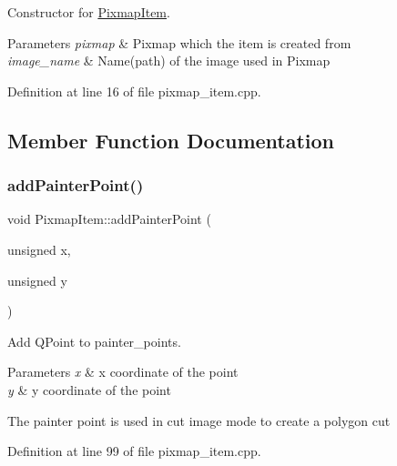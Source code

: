 Constructor for \mbox{\hyperlink{classPixmapItem}{Pixmap\+Item}}. 


\begin{DoxyParams}{Parameters}
{\em pixmap} & Pixmap which the item is created from \\
\hline
{\em image\+\_\+name} & Name(path) of the image used in Pixmap \\
\hline
\end{DoxyParams}


Definition at line 16 of file pixmap\+\_\+item.\+cpp.



\subsection{Member Function Documentation}
\mbox{\label{classPixmapItem_a6e18b1223f61d40dba6e96f4da15ce5c}} 
\subsubsection{\texorpdfstring{add\+Painter\+Point()}{addPainterPoint()}}
{\footnotesize\ttfamily void Pixmap\+Item\+::add\+Painter\+Point (\begin{DoxyParamCaption}\item[{unsigned}]{x,  }\item[{unsigned}]{y }\end{DoxyParamCaption})}



Add Q\+Point to painter\+\_\+points. 


\begin{DoxyParams}{Parameters}
{\em x} & x coordinate of the point \\
\hline
{\em y} & y coordinate of the point\\
\hline
\end{DoxyParams}
The painter point is used in cut image mode to create a polygon cut 

Definition at line 99 of file pixmap\+\_\+item.\+cpp.

\mbox{\label{classPixmapItem_a54810877049ab858d569f83065720a18}} 
